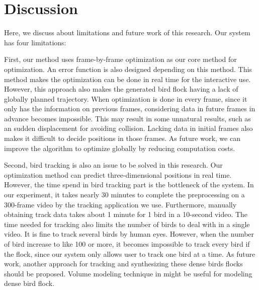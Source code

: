 \chapter{Discussion}








Here, we discuss about limitations and future work of this research. Our system has four limitations:


First, our method uses frame-by-frame optimization as our core method for optimization. An error function is also designed depending on this method. This method makes the optimization can be done in real time for the interactive use. However, this approach also makes the generated bird flock having a lack of globally planned trajectory. When optimization is done in every frame, since it only has the information on previous frames, considering data in future frames in advance becomes impossible. This may result in some unnatural results, such as an sudden displacement for avoiding collision. Lacking data in initial frames also makes it difficult to decide positions in those frames. As future work, we can improve the algorithm to optimize globally by reducing computation costs.


Second, bird tracking is also an issue to be solved in this research. Our optimization method can predict three-dimensional positions in real time. However, the time spend in bird tracking part is the bottleneck of the system. In our experiment, it takes nearly 30 minutes to complete the preprocessing on a 300-frame video by the tracking application we use. Furthermore, manually obtaining track data takes about 1 minute for 1 bird in a 10-second video. The time needed for tracking also limits the number of birds to deal with in a single video. It is fine to track several birds by human eyes. However, when the number of bird increase to like 100 or more, it becomes impossible to track every bird if the flock, since our system only allows user to track one bird at a time. As future work, another approach for tracking and synthesizing these dense birds flocks should be proposed. Volume modeling technique in \cite{Fluid} might be useful for modeling dense bird flock.



